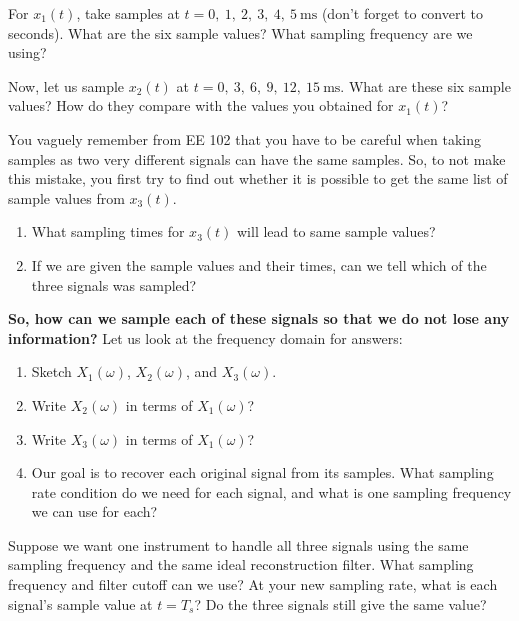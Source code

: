 For $x_1(t)$, take samples at
    \(
    t=0,\ 1,\ 2,\ 3,\ 4,\ 5\ \text{ms}
    \)  (don't forget to convert to seconds).
What are the six sample values? What sampling frequency are we using?

Now, let us sample $x_2(t)$ at
    \(
    t=0,\ 3,\ 6,\ 9,\ 12,\ 15\ \text{ms}.
    \)
What are these six sample values? How do they compare with the values you obtained for $x_1(t)$?

You vaguely remember from EE 102 that you have to be careful when taking samples as two very different signals can have the same samples. So, to not make this mistake, you first try to find out whether it is possible to get the same list of sample values from $x_3(t)$.
\begin{enumerate}
    \item What sampling times for $x_3(t)$ will lead to same sample values? 
    \item If we are given the sample values
    and their times, can we tell which of the three signals was sampled?
\end{enumerate}

\textbf{So, how can we sample each of these signals so that we do not lose
any information?} Let us look at the frequency domain for answers:
\begin{enumerate}[label=(\alph*),resume]
    \item Sketch $X_1(\omega)$, $X_2(\omega)$, and
    $X_3(\omega)$.

    \item Write $X_2(\omega)$ in terms of $X_1(\omega)$?
    \item Write $X_3(\omega)$ in terms of $X_1(\omega)$?

    \item Our goal is to recover each original signal from its samples.
    What sampling rate condition do we need for each signal, and what is
    one sampling frequency we can use for each?

\end{enumerate}

Suppose we want one instrument to handle all three signals using the same sampling frequency and the same ideal reconstruction filter. What sampling frequency and filter cutoff can we use? At your new sampling rate, what is each signal's sample value at $t=T_s$?
Do the three signals still give the same value?
\clearpage

